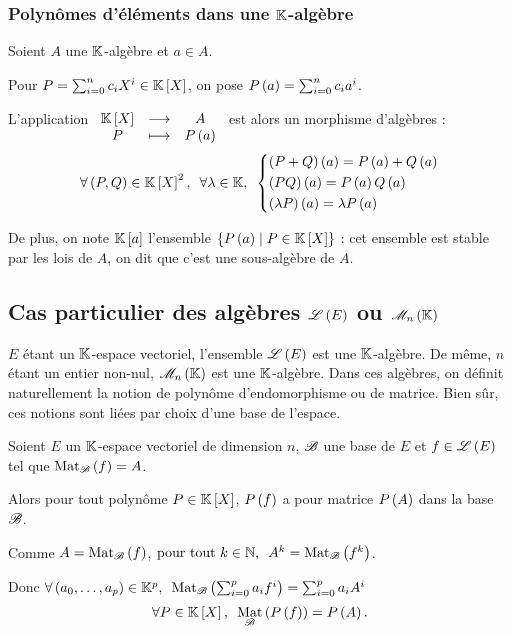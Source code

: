\subsubsection{Polynômes d'éléments dans une \(\mathbb{K}\)-algèbre}

\begin{prop}
Soient \(A\) une \(\mathbb{K}\)-algèbre et \(a\in A\).

Pour \(P=\sum_{i=0}^nc_iX^i\in\poly\), on pose \(P\left(a\right)=\sum_{i=0}^nc_ia^i\).

L'application \(\fonctionlambda{\poly}{A}{P}{P\paren{a}}\) est alors un morphisme d'algèbres : \[\quantifs{\forall\paren{P,Q}\in\poly^2;\forall\lambda\in\K}\begin{dcases}
\paren{P+Q}\paren{a}=P\paren{a}+Q\paren{a} \\
\paren{PQ}\paren{a}=P\paren{a}Q\paren{a} \\
\paren{\lambda P}\paren{a}=\lambda P\paren{a}
\end{dcases}\]

De plus, on note \(\poly[\K][a]\) l'ensemble \(\accol{P\paren{a}\tq P\in\poly}\) : cet ensemble est stable par les lois de \(A\), on dit que c'est une sous-algèbre de \(A\).
\end{prop}

\subsection{Cas particulier des algèbres \(\mathscr{L}\left(E\right)\) ou \(\M{n}\)}

\(E\) étant un \(\mathbb{K}\)-espace vectoriel, l'ensemble \(\mathscr{L}\left(E\right)\) est une \(\mathbb{K}\)-algèbre. De même, \(n\) étant un entier non-nul, \(\M{n}\) est une \(\mathbb{K}\)-algèbre. Dans ces algèbres, on définit naturellement la notion de polynôme d'endomorphisme ou de matrice. Bien sûr, ces notions sont liées par choix d'une base de l'espace.

\begin{prop}
Soient \(E\) un \(\mathbb{K}\)-espace vectoriel de dimension \(n\), \(\mathscr{B}\) une base de \(E\) et \(f\in\mathscr{L}\left(E\right)\) tel que \(\Mat{f}=A\).

Alors pour tout polynôme \(P\in\poly\), \(P\left(f\right)\) a pour matrice \(P\left(A\right)\) dans la base \(\mathscr{B}\).
\end{prop}

\begin{dem}
Comme \(A=\Mat{f}\), \(\quantifs{\tpt k\in\N}A^k=\Mat{f^k}\).

Donc \(\quantifs{\forall\paren{a_0,\dots,a_p}\in\K^p}\Mat{\sum_{i=0}^pa_if^i}=\sum_{i=0}^pa_iA^i\) \cad \[\quantifs{\forall P\in\poly}\Mat{P\paren{f}}=P\paren{A}.\]
\end{dem}


